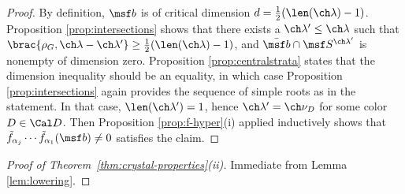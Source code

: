 \begin{proof}
By definition, $\msf b$ is of critical dimension $d= \frac{1}{2}(\len(\ch\lambda)-1)$.
Proposition \ref{prop:intersections} shows that there exists
a $\ch\lambda' \le \ch\lambda$
such that $\brac{\rho_G, \ch\lambda-\ch\lambda'} \ge \frac 1 2(\len(\ch\lambda)-1)$, and $\bar{\msf b} \cap \msf S^{\ch\lambda'}$ is nonempty of dimension zero. Proposition \ref{prop:centralstrata} states that the dimension inequality should be an equality, in which case Proposition \ref{prop:intersections} again provides the sequence of simple roots as in the statement. In that case, $\len(\ch\lambda')=1$, hence $\ch\lambda' = \ch\nu_D$ for some color $D\in \Cal D$.
Then Proposition \ref{prop:f-hyper}(i) applied inductively shows that
$\tilde f_{\alpha_j} \dotsb \tilde f_{\alpha_1}(\msf b) \ne 0$
satisfies the claim.
\end{proof}


\begin{proof}[Proof of Theorem~\ref{thm:crystal-properties}(ii)]
Immediate from Lemma \ref{lem:lowering}.
\end{proof}





